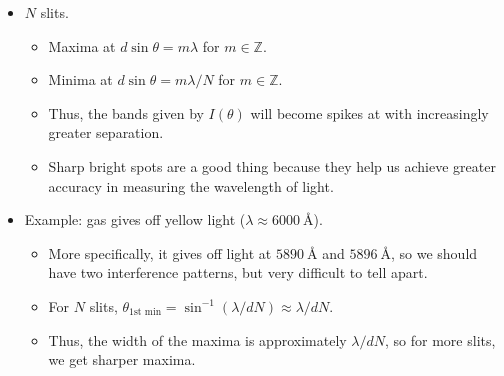 \documentclass[../notes.tex]{subfiles}
\begin{document}
\begin{itemize}
\begin{itemize}
\begin{figure}[H]
\begin{subfigure}[b]{0.45\linewidth}
                \caption{Set angles.}
                \label{fig:phaserDiagramb}
            \end{subfigure}
            \caption{Phaser diagram for three cosines.}
            \label{fig:phaserDiagram}
        \end{figure}
        \begin{itemize}
            \item We can use a \textbf{phaser diagram}.
            \item From Figure \ref{fig:phaserDiagram}, we can see that if $\phi=\ang{120},\ang{240},\dots$, then we get cancellation. In other words, we must have $\Delta r=n\lambda/3$ for $\lambda\in\mathbb{Z}$.
        \end{itemize}
    \end{itemize}
    \item $N$ slits.
    \begin{itemize}
        \item Maxima at $d\sin\theta=m\lambda$ for $m\in\mathbb{Z}$.
        \item Minima at $d\sin\theta=m\lambda/N$ for $m\in\mathbb{Z}$.
        \item Thus, the bands given by $I(\theta)$ will become spikes at with increasingly greater separation.
        \item Sharp bright spots are a good thing because they help us achieve greater accuracy in measuring the wavelength of light.
    \end{itemize}
    \item Example:  gas gives off yellow light ($\lambda\approx\SI{6000}{\angstrom}$).
    \begin{itemize}
        \item More specifically, it gives off light at $\SI{5890}{\angstrom}$ and $\SI{5896}{\angstrom}$, so we should have two interference patterns, but very difficult to tell apart.
        \item For $N$ slits, $\theta_\text{1st min}=\sin^{-1}(\lambda/dN)\approx\lambda/dN$.
        \item Thus, the width of the maxima is approximately $\lambda/dN$, so for more slits, we get sharper maxima.

\end{itemize}
\end{itemize}
\end{document}
